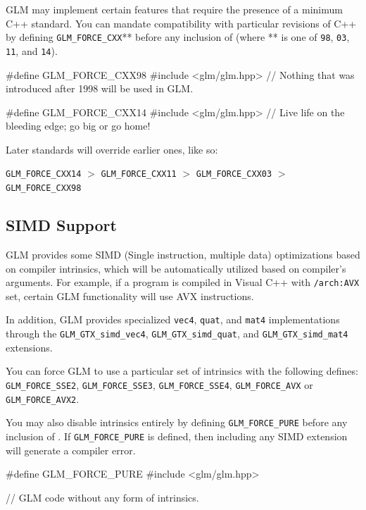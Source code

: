 \documentclass{scrartcl}
\numberwithin{figure}{subsection}
\begin{document}
GLM may implement certain features that require the presence of a minimum C++ standard. You can mandate compatibility with particular revisions of C++ by defining \verb|GLM_FORCE_CXX|** before any inclusion of  (where ** is one of \verb|98|, \verb|03|, \verb|11|, and \verb|14|).

\begin{cppcode}
#define GLM_FORCE_CXX98 
#include <glm/glm.hpp>
// Nothing that was introduced after 1998 will be used in GLM.
\end{cppcode}

\begin{cppcode}
#define GLM_FORCE_CXX14 
#include <glm/glm.hpp>
// Live life on the bleeding edge; go big or go home!
\end{cppcode}

Later standards will override earlier ones, like so:

\verb|GLM_FORCE_CXX14| $>$ \verb|GLM_FORCE_CXX11| $>$ \verb|GLM_FORCE_CXX03| $>$ \verb|GLM_FORCE_CXX98|

\subsection{SIMD Support}

GLM provides some SIMD (Single instruction, multiple data) optimizations based on compiler intrinsics, which will be automatically utilized based on compiler's arguments. For example, if a program is compiled in Visual C++ with \verb|/arch:AVX| set, certain GLM functionality will use AVX instructions.

In addition, GLM provides specialized \verb|vec4|, \verb|quat|, and \verb|mat4| implementations through the \verb|GLM_GTX_simd_vec4|, \verb|GLM_GTX_simd_quat|, and \verb|GLM_GTX_simd_mat4| extensions.

You can force GLM to use a particular set of intrinsics with the following defines: \verb|GLM_FORCE_SSE2|, \verb|GLM_FORCE_SSE3|, \verb|GLM_FORCE_SSE4|, \verb|GLM_FORCE_AVX| or \verb|GLM_FORCE_AVX2|.

You may also disable intrinsics entirely by defining \verb|GLM_FORCE_PURE| before any inclusion of . If \verb|GLM_FORCE_PURE| is defined, then including any SIMD extension will generate a compiler error.

\begin{cppcode}
#define GLM_FORCE_PURE
#include <glm/glm.hpp>

// GLM code without any form of intrinsics.
\end{cppcode}
\end{document}

